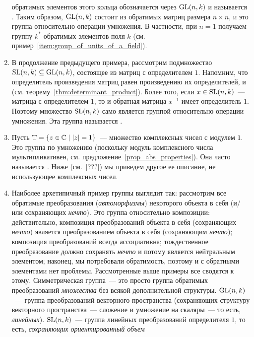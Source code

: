 \begin{examples}
\begin{enumerate}
  обратимых элементов этого кольца обозначается через $\operatorname{GL}(n,k)$ и
  называется . Таким образом, $\operatorname{GL}(n,k)$ состоит из обратимых матриц
  размера $n\times n$, и это группа относительно операции умножения.
  В частности, при $n=1$ получаем группу $k^*$ обратимых элементов
  поля $k$ (см. пример~\ref{item:group_of_units_of_a_field}).
\item\label{item:special_linear_example} В продолжение предыдущего
  примера, рассмотрим подмножество
  $\operatorname{SL}(n,k)\subseteq\operatorname{GL}(n,k)$, состоящее из матриц с определителем
  $1$. Напомним, что определитель произведения матриц равен
  произведению их определителей, и
  (см. теорему~\ref{thm:determinant_product}). Более того, если
  $x\in\operatorname{SL}(n,k)$~--- матрица с определителем $1$, то и обратная
  матрица $x^{-1}$ имеет определитель $1$. Поэтому
  множество $\operatorname{SL}(n,k)$ само является группой относительно операции
  умножения. Эта группа называется .
\item\label{item:group_of_angles}
  Пусть $\mathbb T = \{z\in\mathbb C\mid |z| = 1\}$~--- множество
  комплексных чисел с модулем $1$. Это группа по умножению
  (поскольку модуль комплексного числа мультипликативен,
  см. предложение~\ref{prop_abs_properties}).
  Она часто называется .
  Ниже (см.~\ref{???}) мы приведем другое ее описание, не использующее
  комплексных чисел.
\item\label{item:geometric_groups} Наиболее архетипичный пример группы
  выглядит так: рассмотрим все обратимые преобразования
  ({\it автоморфизмы}) некоторого объекта в себя (и/или сохраняющих
  {\it нечто}). Это группа
  относительно композиции: действительно, композиция преобразований
  объекта в себя (сохраняющих {\it нечто}) является преобразованием
  объекта в себя (сохраняющим {\it нечто}); композиция преобразований
  всегда ассоциативна; тождественное преобразование должно сохранять
  {\it нечто} и потому является нейтральным элементом; наконец, мы
  потребовали обратимость, поэтому и с обратными элементами нет
  проблемы. Рассмотренные выше примеры все сводятся к
  этому. Симметрическая группа~--- это просто группа обратимых
  преобразований {\it множества} без всякой дополнительной
  структуры. $\operatorname{GL}(n,k)$~--- группа преобразований векторного
  пространства (сохраняющих структуру векторного пространства~---
  сложение и умножение на скаляры~--- то есть,
  {\it линейных}). $\operatorname{SL}(n,k)$~--- группа линейных преобразований
  определителя $1$, то есть, {\it сохраняющих ориентированный объем}

\end{enumerate}
\end{examples}

